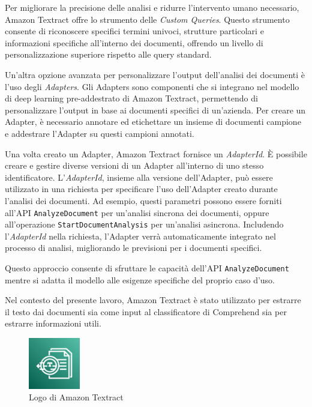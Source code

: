Per migliorare la precisione delle analisi e ridurre l'intervento umano necessario, Amazon Textract offre lo strumento delle \textit{Custom Queries}. Questo strumento consente di riconoscere specifici termini univoci, strutture particolari e informazioni specifiche all'interno dei documenti, offrendo un livello di personalizzazione superiore rispetto alle query standard.

Un'altra opzione avanzata per personalizzare l'output dell'analisi dei documenti è l'uso degli \textit{Adapters}. Gli Adapters sono componenti che si integrano nel modello di deep learning pre-addestrato di Amazon Textract, permettendo di personalizzare l'output in base ai documenti specifici di un'azienda. Per creare un Adapter, è necessario annotare ed etichettare un insieme di documenti campione e addestrare l'Adapter su questi campioni annotati.

Una volta creato un Adapter, Amazon Textract fornisce un \textit{AdapterId}. È possibile creare e gestire diverse versioni di un Adapter all'interno di uno stesso identificatore. L'\textit{AdapterId}, insieme alla versione dell'Adapter, può essere utilizzato in una richiesta per specificare l'uso dell'Adapter creato durante l'analisi dei documenti. Ad esempio, questi parametri possono essere forniti all'API \texttt{AnalyzeDocument} per un'analisi sincrona dei documenti, oppure all'operazione \texttt{StartDocumentAnalysis} per un'analisi asincrona. Includendo l'\textit{AdapterId} nella richiesta, l'Adapter verrà automaticamente integrato nel processo di analisi, migliorando le previsioni per i documenti specifici.

Questo approccio consente di sfruttare le capacità dell'API \texttt{AnalyzeDocument} mentre si adatta il modello alle esigenze specifiche del proprio caso d'uso. 

Nel contesto del presente lavoro, Amazon Textract è stato utilizzato per estrarre il testo dai documenti sia come input al classificatore di Comprehend sia per estrarre informazioni utili.

\begin{figure}[h]
  \centering
  \includegraphics[width=0.2\textwidth]{img/tecnologie/textract.png}
  \caption{Logo di Amazon Textract}
  \label{fig:textract}
\end{figure}

